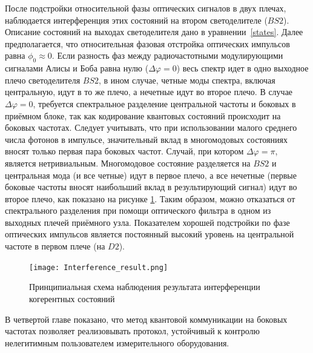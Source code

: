 После подстройки относительной фазы оптических сигналов в двух плечах, наблюдается интерференция этих состояний на втором светоделителе ($BS2$). Описание состояний на выходах светоделителя дано в уравнении~\ref{states}. Далее предполагается, что относительная фазовая отстройка оптических импульсов равна $\phi_0\approx0$. Если разность фаз между радиочастотными модулирующими сигналами Алисы и Боба равна нулю ($\Delta\varphi=0$) весь спектр идет в одно выходное плечо светоделителя $BS2$, в ином случае, четные моды спектра, включая центральную, идут в то же плечо, а нечетные идут во второе плечо. В случае $\Delta\varphi=0$, требуется спектральное разделение центральной частоты и боковых в приёмном блоке, так как кодирование квантовых состояний происходит на боковых частотах. Следует учитывать, что при использовании малого среднего числа фотонов в импульсе, значительный вклад в многомодовых состояниях вносят только первая пара боковых частот. Случай, при котором $\Delta\varphi=\pi$, является нетривиальным. Многомодовое состояние разделяется на $BS2$ и центральная мода (и все четные) идут в первое плечо, а все нечетные (первые боковые частоты вносят наибольший вклад в результирующий сигнал) идут во второе плечо, как показано на рисунке \ref{fig:Interference_result}. Таким образом, можно отказаться от спектрального разделения при помощи оптического фильтра в одном из выходных плечей приёмного узла. Показателем хорошей подстройки по фазе оптических импульсов является постоянный высокий уровень на центральной частоте в первом плече (на $D2$).  


\begin{figure}[ht]
 \centering
  \texttt{[image: Interference\_result.png]}
  \caption{Принципиальная схема наблюдения результата интерференции когерентных состояний}
  \label{fig:Interference_result}
\end{figure}

 
В четвертой главе показано, что метод квантовой коммуникации на боковых частотах позволяет реализовывать протокол, устойчивый к контролю нелегитимным пользователем измерительного оборудования. 

